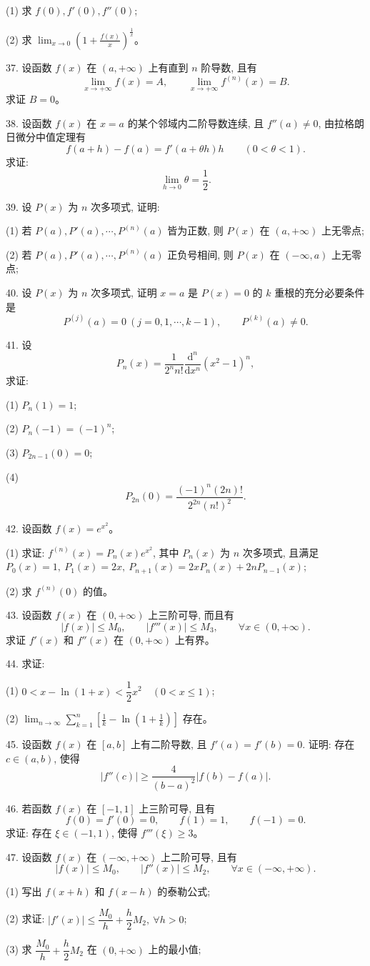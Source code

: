 \documentclass[UTF8,12pt,a4paper,fontset=fandol]{ctexart}
\begin{document}
(1) 求 $f(0),f'(0),f''(0)$;

(2) 求 $\displaystyle\lim_{x\to0}\left(1+\frac{f(x)}x\right)^{\frac1x}$。

37. 设函数 $f(x)$ 在 $(a,+\infty)$ 上有直到 $n$ 阶导数, 且有
\[
  \lim_{x\to+\infty}f(x)=A,\qquad
  \lim_{x\to+\infty}f^{(n)}(x)=B.
\]
求证 $B=0$。

38. 设函数 $f(x)$ 在 $x=a$ 的某个邻域内二阶导数连续, 且 $f''(a)\ne0$, 由拉格朗日微分中值定理有
\[
  f(a+h)-f(a)=f'(a+\theta h)h\qquad (0<\theta<1).
\]
求证:
\[
  \lim_{h\to0}\theta=\frac12.
\]

39. 设 $P(x)$ 为 $n$ 次多项式, 证明:

(1) 若 $P(a),P'(a),\cdots,P^{(n)}(a)$ 皆为正数, 则 $P(x)$ 在 $(a,+\infty)$ 上无零点;

(2) 若 $P(a),P'(a),\cdots,P^{(n)}(a)$ 正负号相间, 则 $P(x)$ 在 $(-\infty,a)$ 上无零点;

40. 设 $P(x)$ 为 $n$ 次多项式, 证明 $x=a$ 是 $P(x)=0$ 的 $k$ 重根的充分必要条件是
\[
  P^{(j)}(a)=0\ (j=0,1,\cdots,k-1),\qquad P^{(k)}(a)\ne0.
\]

41. 设
\[
  P_n(x)=\frac1{2^n n!}\frac{\mathrm d^n}{\mathrm dx^n}(x^2-1)^n,
\]
求证:

(1) $P_n(1)=1$;

(2) $P_n(-1)=(-1)^n$;

(3) $P_{2n-1}(0)=0$;

(4)
\[
  P_{2n}(0)=\frac{(-1)^n(2n)!}{2^{2n}(n!)^2}.
\]

42. 设函数 $f(x)=e^{x^2}$。

(1) 求证: $f^{(n)}(x)=P_n(x)e^{x^2}$, 其中 $P_n(x)$ 为 $n$ 次多项式, 且满足 $P_0(x)=1,\ P_1(x)=2x,\ P_{n+1}(x)=2xP_n(x)+2nP_{n-1}(x)$;

(2) 求 $f^{(n)}(0)$ 的值。

43. 设函数 $f(x)$ 在 $(0,+\infty)$ 上三阶可导, 而且有
\[
  |f(x)|\leqslant M_0,\qquad |f'''(x)|\leqslant M_3,\qquad \forall x\in(0,+\infty).
\]
求证 $f'(x)$ 和 $f''(x)$ 在 $(0,+\infty)$ 上有界。

44. 求证:

(1) $0<x-\ln(1+x)<\dfrac12x^2\quad (0<x\leqslant1)$;

(2) $\displaystyle\lim_{n\to\infty}\sum_{k=1}^n\left[\frac1k-\ln\left(1+\frac1k\right)\right]$ 存在。

45. 设函数 $f(x)$ 在 $[a,b]$ 上有二阶导数, 且 $f'(a)=f'(b)=0$. 证明: 存在 $c\in(a,b)$, 使得
\[
  |f''(c)|\geqslant\frac4{(b-a)^2}|f(b)-f(a)|.
\]

46. 若函数 $f(x)$ 在 $[-1,1]$ 上三阶可导, 且有
\[
  f(0)=f'(0)=0,\qquad f(1)=1,\qquad f(-1)=0.
\]
求证: 存在 $\xi\in(-1,1)$, 使得 $f'''(\xi)\geqslant3$。

47. 设函数 $f(x)$ 在 $(-\infty,+\infty)$ 上二阶可导, 且有
\[
  |f(x)|\leqslant M_0,\qquad |f''(x)|\leqslant M_2,\qquad \forall x\in(-\infty,+\infty).
\]

(1) 写出 $f(x+h)$ 和 $f(x-h)$ 的泰勒公式;

(2) 求证: $|f'(x)|\leqslant\dfrac{M_0}h+\dfrac h2M_2,\ \forall h>0$;

(3) 求 $\dfrac{M_0}h+\dfrac h2M_2$ 在 $(0,+\infty)$ 上的最小值;
\end{document}

